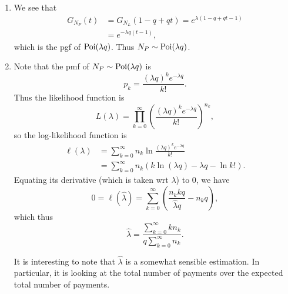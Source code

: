 \documentclass[notoc,notitlepage]{tufte-book}
\begin{document}
\begin{solution}
  \begin{enumerate}
    \item We see that
      \begin{align*}
        G_{N_P}(t) &= G_{N_L}(1 - q + qt) = e^{\lambda(1 - q + qt - 1)} \\
                   &= e^{-\lambda q(t - 1)},
      \end{align*}
      which is the pgf of $\operatorname{Poi}(\lambda q)$. Thus $N_P \sim \operatorname{Poi}(\lambda q)$.

    \item Note that the pmf of $N_P \sim \operatorname{Poi}(\lambda q)$ is
      \begin{equation*}
        p_k = \frac{(\lambda q)^k e^{-\lambda q}}{k!}.
      \end{equation*}
      Thus the likelihood function is
      \begin{equation*}
        L(\lambda) = \prod_{k=0}^{\infty} \left(\frac{(\lambda q)^k e^{-\lambda
        q}}{k!}\right)^{n_k},
      \end{equation*}
      so the log-likelihood function is
      \begin{align*}
        \ell(\lambda)
        &= \sum_{k = 0}^{\infty} n_k \ln \frac{(\lambda q)^k e^{-\lambda q}}{k!}
        \\
        &= \sum_{k=0}^{\infty} n_k \left( 
          k \ln (\lambda q) - \lambda q - \ln k!
        \right).
      \end{align*}
      Equating its derivative (which is taken wrt $\lambda$) to $0$,
      we have
      \begin{equation*}
        0 = \ell(\hat{\lambda})
        = \sum_{k=0}^{\infty} \left( \frac{n_k k q}{\hat{\lambda} q} - n_k q
        \right),
      \end{equation*}
      which thus
      \begin{equation*}
        \hat{\lambda} = \frac{ \sum_{k=0}^{\infty} kn_k }{q \sum_{k=0}^{\infty}
          n_k}.
      \end{equation*}

      It is interesting to note that $\hat{\lambda}$
      is a somewhat sensible estimation.
      In particular, it is looking at the
      total number of payments over the expected total number of payments.
  \end{enumerate}
\end{solution}
\end{document}

